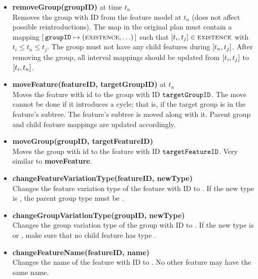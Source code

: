 \begin{itemize}
  \item \textbf{removeGroup(groupID)} at time $t_n$\\
    Removes the group with ID  from the feature model at $t_n$ (does not affect possible reintroductions). The \groups{} map in the original plan must contain a mapping $[ \,\texttt{groupID} \mapsto (\textsc{existence}, \ldots)\, ]$ such that $\interval{t_i}{t_j} \in \map{existence}$ with $t_i \leq t_n \leq t_j$. The group must not have any child features during $\interval{t_n}{t_j}$. After removing the group, all interval mappings should be updated from $\interval{t_i}{t_j}$ to $\interval{t_i}{t_n}$. 
  \item \textbf{moveFeature(featureID, targetGroupID)} at $t_n$\\
    Moves the feature with id  to the group with ID $\texttt{targetGroupID}$. The move cannot be done if it introduces a cycle; that is, if the target group is in the feature's subtree. The feature's subtree is moved along with it. Parent group and child feature mappings are updated accordingly. 
  \item \textbf{moveGroup(groupID, targetFeatureID)} \\
    Moves the group with id  to the feature with ID $\texttt{targetFeatureID}$. Very similar to \textbf{moveFeature}. 
  \item \textbf{changeFeatureVariationType(featureID, newType)} \\
    Changes the feature variation type of the feature with ID  to . If the new type is \mandatory{}, the parent group type must be \andtype{}. 
  \item \textbf{changeGroupVariationType(groupID, newType)}\\
    Changes the group variation type of the group with ID  to . If the new type is \ortype{} or \xortype{}, make sure that no child feature has type \mandatory{}. 
  \item \textbf{changeFeatureName(featureID, name)}\\
    Changes the name of the feature with ID  to . No other feature may have the same name.
\end{itemize}


